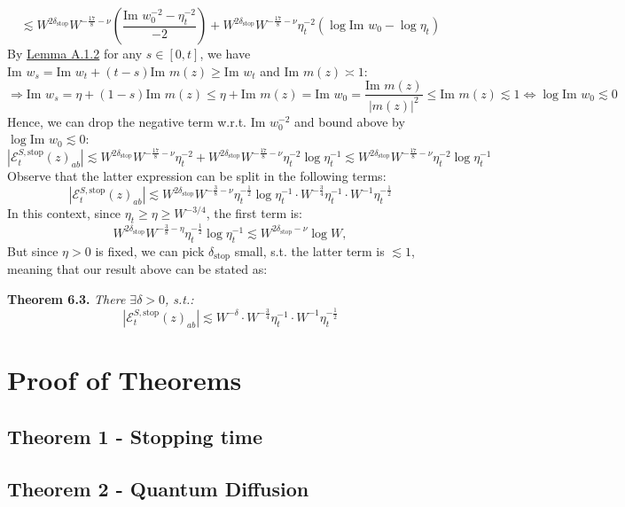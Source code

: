 \documentclass[11pt]{article}
\newenvironment{boxtheorem}[1]
  {\begin{mdframed}\noindent\textbf{#1}\itshape\space}
  {\end{mdframed}}
\newcommand{\E}{\mathcal{E}}
\newcommand{\sto}{\text{stop}}
\newcommand{\im}{\text{Im }}
\begin{document}
\begin{equation*}
\lesssim W^{2\delta_\sto} W^{-\frac{17}{8}-\nu} \left(\frac{\im w_0^{-2}-\eta_t^{-2}}{-2}\right)+W^{2\delta_\sto}W^{-\frac{17}{8}-\nu}\eta_t^{-2}\left(\log \im w_0-\log \eta_t\right)
\end{equation*}
By \hyperref[lemma-a12]{Lemma A.1.2} for any $s\in [0, t]$, we have $\im w_s = \im w_t+(t-s)\im m(z)\geq \im w_t$
and \hyperref[2.1]{$\im m(z)\asymp 1$}:
$$\Rightarrow \im w_s = \eta+(1-s)\im m(z)\leq \eta+ \im m(z) = \im w_0 = \frac{\im m(z)}{|m(z)|^2}\leq \im m(z)\lesssim 1\Leftrightarrow \log \im w_0\lesssim 0$$
Hence, we can drop the negative term w.r.t. $\im w_0^{-2}$ and bound above by $\log \im w_0\lesssim 0$:
\begin{equation*}
|\E_t^{S, \sto}(z)_{ab}|\lesssim W^{2\delta_\sto} W^{-\frac{17}{8}-\nu} \eta_t^{-2}+W^{2\delta_\sto}W^{-\frac{17}{8}-\nu}\eta_t^{-2}\log \eta_t^{-1} \lesssim W^{2\delta_\sto}W^{-\frac{17}{8}-\nu}\eta_t^{-2}\log \eta_t^{-1}
\end{equation*}
Observe that the latter expression can be split in the following terms: $$|\E_t^{S, \sto}(z)_{ab}|\lesssim W^{2\delta_\sto} W^{-\frac{3}{8}-\nu} \eta_t^{-\frac{1}{2}}\log \eta_t^{-1}\cdot W^{-\frac{3}{4}}\eta_t^{-1}\cdot W^{-1}\eta_t^{-\frac{1}{2}}$$
In this context, since $\eta_t \geq \eta\geq W^{-3/4}$, the first term is: $$W^{2\delta_\sto} W^{-\frac{3}{8}-\eta}\eta_t^{-\frac{1}{2}}\log \eta_t^{-1}\lesssim W^{2\delta_\sto-\nu}\log W,$$
But since $\eta>0$ is fixed, we can pick $\delta_\sto$ small, s.t. the latter term is $\lesssim 1$, meaning that our result above can be stated as: 
\begin{boxtheorem}{Theorem 6.3. }There $\exists \delta>0$, s.t.:
$$|\E_t^{S, \sto}(z)_{ab}|\lesssim W^{-\delta}\cdot W^{-\frac{3}{4}}\eta_t^{-1}\cdot W^{-1}\eta_t^{-\frac{1}{2}}$$
\end{boxtheorem}

\newpage

\section{Proof of Theorems}

\subsection{Theorem 1 - Stopping time}
\label{proof-stop}

\subsection{Theorem 2 - Quantum Diffusion}
\end{document}
